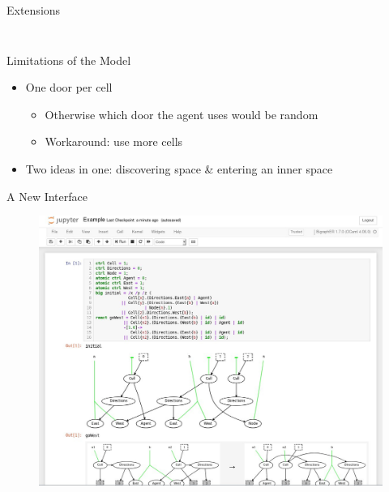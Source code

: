 \documentclass{beamer}
\begin{document}
\begin{frame}{Extensions}
\begin{columns}
\begin{column}{0.5\textwidth}
\begin{figure}
      \end{figure}
    \end{column}
  \end{columns}
  \pause
\end{frame}

\begin{frame}{Limitations of the Model}
  \begin{itemize}
  \item One door per cell
    \begin{itemize}
    \item Otherwise which door the agent uses would be random
      \pause
    \item Workaround: use more cells
    \end{itemize}
    \pause
  \item Two ideas in one: discovering space \& entering an inner space
  \end{itemize}
\end{frame}

\begin{frame}{A New Interface}
  \begin{figure}
    \centering
    \includegraphics{screenshot.jpg}
  \end{figure}
\end{frame}
\end{document}
